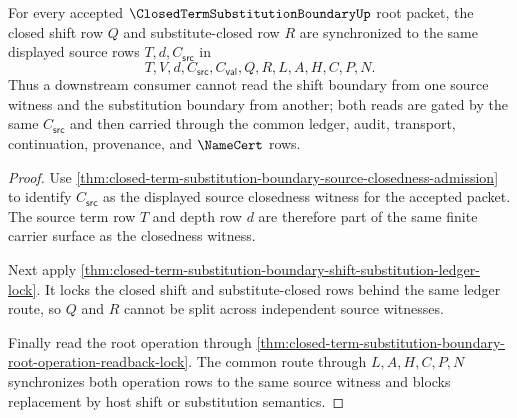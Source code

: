 \begin{theorem}
\label{thm:closed-term-substitution-boundary-shift-substitution-source-synchronization}
For every accepted $\ClosedTermSubstitutionBoundaryUp$ root packet, the closed shift row $Q$ and substitute-closed row $R$ are synchronized to the same displayed source rows $T,d,C_{\mathsf{src}}$ in
$$
T,V,d,C_{\mathsf{src}},C_{\mathsf{val}},Q,R,L,A,H,C,P,N.
$$
Thus a downstream consumer cannot read the shift boundary from one source witness and the substitution boundary from another; both reads are gated by the same $C_{\mathsf{src}}$ and then carried through the common ledger, audit, transport, continuation, provenance, and $\NameCert$ rows.
\end{theorem}
\begin{proof}
Use \autoref{thm:closed-term-substitution-boundary-source-closedness-admission} to identify $C_{\mathsf{src}}$ as the displayed source closedness witness for the accepted packet. The source term row $T$ and depth row $d$ are therefore part of the same finite carrier surface as the closedness witness.

Next apply \autoref{thm:closed-term-substitution-boundary-shift-substitution-ledger-lock}. It locks the closed shift and substitute-closed rows behind the same ledger route, so $Q$ and $R$ cannot be split across independent source witnesses.

Finally read the root operation through \autoref{thm:closed-term-substitution-boundary-root-operation-readback-lock}. The common route through $L,A,H,C,P,N$ synchronizes both operation rows to the same source witness and blocks replacement by host shift or substitution semantics.
\end{proof}

